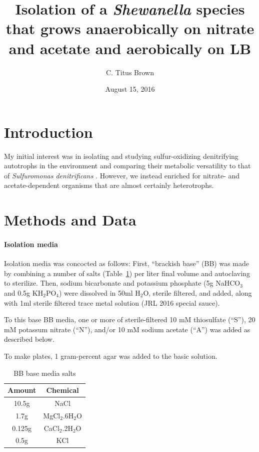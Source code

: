 \documentclass{article}
\begin{document}
\title{Isolation of a {\em Shewanella} species that grows
  anaerobically on nitrate and acetate and aerobically on LB}
\author{C. Titus Brown}
\date{August 15, 2016}

\maketitle

\section*{Introduction}

My initial interest was in isolating and studying sulfur-oxidizing
denitrifying autotrophs in the environment and comparing their
metabolic versatility to that of {\em Sulfuromonas denitrificans}
\cite{sievert2008genome}.  However, we instead enriched for nitrate-
and acetate-dependent organisms that are almost certainly
heterotrophs.

\section*{Methods and Data}

\paragraph{Isolation media} Isolation media was concocted as follows:
First, ``brackish base'' (BB) was made by combining a number of salts
(Table~\ref{tab:media}) per liter final volume and autoclaving to
sterilize.  Then, sodium bicarbonate and potassium phosphate (5g
NaHCO$_3$ and 0.5g KH$_2$PO$_4$) were dissolved in 50ml H$_2$O,
sterile filtered, and added, along with 1ml sterile filtered trace
metal solution (JRL 2016 special sauce).

To this base BB media, one or more of sterile-filtered 10 mM
thiosulfate (``S''), 20 mM potassum nitrate (``N''), and/or 10 mM
sodium acetate (``A'') was added as described below.

To make plates, 1 gram-percent agar was added to the basic solution.

\begin{table}
\centering
\begin{tabular}{|c|c|}
\hline
Amount & Chemical \\
\hline
10.5g & NaCl \\
1.7g & MgCl$_2$.6H$_2$O \\
0.125g & CaCl$_2$.2H$_2$O \\
0.5g & KCl \\
\hline
\end{tabular}
\caption{BB base media salts}
\label{tab:media}
\end{table}
\end{document}

